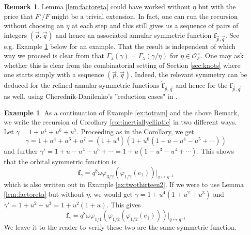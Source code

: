 \documentclass{amsart}
\numberwithin{equation}{section}
\theoremstyle{definition}
\newtheorem{example}[lemma]{Example}%
\newtheorem{remark}[lemma]{Remark}%
\def\hat{\widehat}
\newcommand{\frs}{\mathbf{f}_{\vec{p},\vec{q}}}
\newcommand{\fpq}{\frs}
\newcommand{\fgamma}{\mathbf{f}_{\gamma}}
\newcommand{\cO}{\mathcal{O}}
\newcommand{\fqrs}{\hat{\mathbf{f}}_{\vec{p},\vec{q}}}
\begin{document}
\begin{remark}
    Lemma \ref{lem:factoreta} could have worked without $\eta$ but with the price that $F'/F$ might be a trivial extension. In fact, one can run the recursion without choosing an $\eta$ at each step
    and this still gives us a sequence of pairs of integers $(\vec{p},\vec{q})$ and hence an associated annular symmetric function $\frs$. See e.g. Example \ref{ex:reductioncase} below for an example. That the result is independent of which way we proceed is clear from that $\Gamma_{\lambda}(\gamma)=\Gamma_{\lambda}(\gamma/\eta)$ for $\eta\in\cO_F^{\times}$. One may ask whether this is clear from the combinatorial setting of Section \ref{sec:knots} where one starts simply with a sequence $(\vec{p},\vec{q})$. Indeed, the relevant symmetry can be deduced for the refined annular symmetric functions $\fqrs$ and hence for the $\fpq$ as well, using Cherednik-Danilenko's ''reduction cases" in \cite[(4.4)--(4.5)]{CD2}. 
\end{remark}
\begin{example}
\label{ex:reductioncase}
As a continuation of Example \ref{ex:totram} and the above Remark, we write the recursion of Corollary \ref{cor:inertiallyelliptic} in two different ways. Let $\gamma=1+u^4+u^6+u^7$. Proceeding as in the Corollary, we get 
$$
\gamma=1+u^4+u^6+u^7=(1+u^4)(1+u^6(1+u-u^4-u^5+\cdots))
$$
and further $\gamma'=1+u-u^4-u^5+\cdots=1+u(1-u^3-u^4+\cdots)$. This shows that the orbital symmetric function is 
$$\fgamma=q^8\omega\varphi_{3/2}(\varphi_{1/2}(e_1))|_{q\mapsto q^{-1}}$$ which is also written out in Example \ref{ex:twothirteen2}.
If we were to use Lemma \ref{lem:factoreta} but without $\eta$, we would get $\gamma=1+u^4(1+u^2+u^3)$ and 
$\gamma'=1+u^2+u^3=1+u^2(1+u)$. This gives 
$$\fgamma=q^8\omega\varphi_{1/1}(\varphi_{1/2}(\varphi_{1/2}(e_1)))|_{q\mapsto q^{-1}}$$ We leave it to the reader to verify these two are the same symmetric function.
\end{example}
\end{document}
